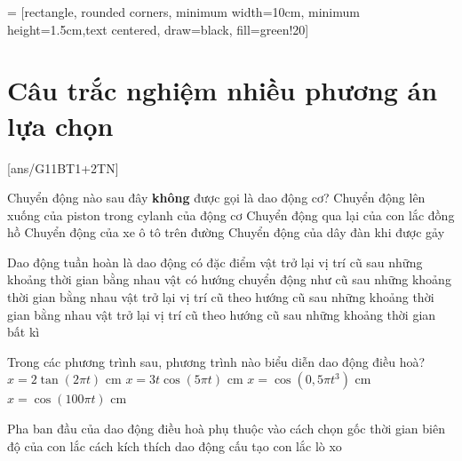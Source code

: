  = [rectangle, rounded corners, minimum width=10cm, minimum height=1.5cm,text centered, draw=black, fill=green!20]
\begin{center}
\end{center}
\setcounter{section}{0}
\section{Câu trắc nghiệm nhiều phương án lựa chọn}
\setcounter{ex}{0}
[ans/G11BT1+2TN]
\begin{ex}
	Chuyển động nào sau đây \textbf{không} được gọi là dao động cơ?
	\choice
	{Chuyển động lên xuống của piston trong cylanh của động cơ}
	{Chuyển động qua lại của con lắc đồng hồ}
	{\True Chuyển động của xe ô tô trên đường}
	{Chuyển động của dây đàn khi được gảy}
	\loigiai{}
\end{ex}
\begin{ex}
	Dao động tuần hoàn là dao động có đặc điểm
	\choice
	{vật trở lại vị trí cũ sau những khoảng thời gian bằng nhau}
	{vật có hướng chuyển động như cũ sau những khoảng thời gian bằng nhau}
	{\True vật trở lại vị trí cũ theo hướng cũ sau những khoảng thời gian bằng nhau}
	{vật trở lại vị trí cũ theo hướng cũ sau những khoảng thời gian bất kì}
	\loigiai{}
\end{ex}
\begin{ex}
Trong các phương trình sau, phương trình nào biểu diễn dao động điều hoà?
	\choice
	{$x=2\tan\left(2\pi t\right)$ cm}
	{$x=3t\cos\left(5\pi t\right)$ cm}
	{$x=\cos \left(0,5\pi t^{3}\right)$ cm}
	{\True $x=\cos\left(100\pi t\right)$ cm}
	\loigiai{}
\end{ex}
\begin{ex}
	Pha ban đầu của dao động điều hoà phụ thuộc vào
	\choice
	{\True cách chọn gốc thời gian}
	{biên độ của con lắc}
	{cách kích thích dao động}
	{cấu tạo con lắc lò xo}
	\loigiai{}
\end{ex}
